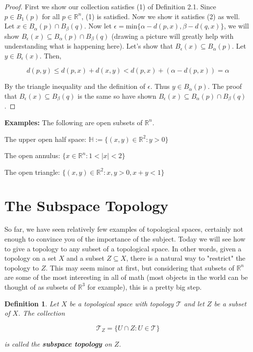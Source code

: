 \documentclass[a4paper]{article}
\newtheorem{definition}[theorem]{Definition}
\numberwithin{theorem}{section}
\begin{document}
\begin{proof}
First we show our collection satisfies (1) of Definition 2.1. Since $p \in B_1(p)$ for all $p \in \mathbb{R}^n$, (1) is satisfied. Now we show it satisfies (2) as well. Let $x \in B_\alpha(p) \cap B_\beta(q)$. Now let $\epsilon = \textrm{min}\{\alpha - d(p,x),\beta - d(q,x)\}$, we will show $B_\epsilon(x) \subseteq B_\alpha(p) \cap B_\beta(q)$ (drawing a picture will greatly help with understanding what is happening here). Let's show that $B_\epsilon(x) \subseteq B_\alpha(p)$. Let $y \in B_\epsilon(x)$. Then,

$$ d(p,y) \leq d(p,x) + d(x,y) < d(p,x) + (\alpha - d(p,x)) = \alpha $$

By the triangle inequality and the definition of $\epsilon$. Thus $y \in B_\alpha(p)$. The proof that $B_\epsilon(x) \subseteq B_\beta(q)$ is the same so have shown $B_\epsilon(x) \subseteq B_\alpha(p) \cap B_\beta(q)$.

\end{proof}

\textbf{Examples:} The following are open subsets of $\mathbb{R}^n$.

The upper open half space: $\mathbb{H} := \{(x,y) \in \mathbb{R}^2 : y > 0\}$

The open annulus: $\{x \in \mathbb{R}^n : 1 < |x| < 2\}$

The open triangle: $\{(x,y) \in \mathbb{R}^2 : x,y > 0, x+y<1\}$

\section{The Subspace Topology}

So far, we have seen relatively few examples of topological spaces, certainly not enough to convince you of the importance of the subject. Today we will see how to give a topology to any subset of a topological space. In other words, given a topology on a set $X$ and a subset $Z \subseteq X$, there is a natural way to "restrict" the topology to $Z$. This may seem minor at first, but considering that subsets of $\mathbb{R}^n$ are some of the most interesting in all of math (most objects in the world can be thought of as subsets of $\mathbb{R}^3$ for example), this is a pretty big step.

\begin{definition}
Let $X$ be a topological space with topology $\mathcal{T}$ and let $Z$ be a subset of $X$. The collection

$$ \mathcal{T}_{Z} = \{U \cap Z : U \in \mathcal{T}\} $$

is called the \textbf{subspace topology} on $Z$.

\end{definition}
\end{document}
